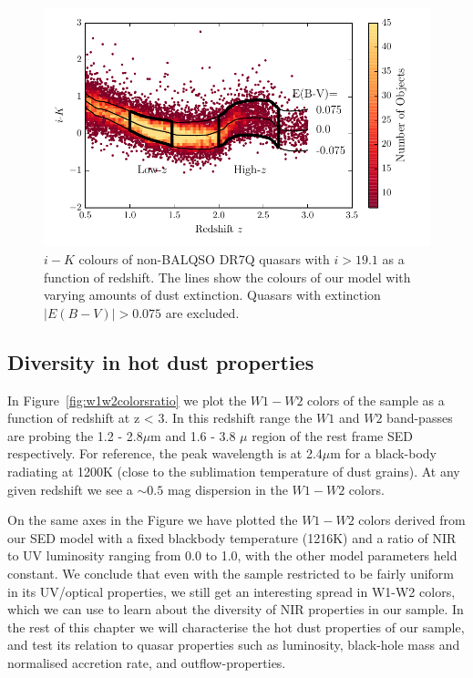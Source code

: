 \begin{figure}
  \centering
  \includegraphics[width=\columnwidth]{figures/chapter05/ik_versus_z_low_ext.pdf}
  \caption{$i-K$ colours of non-BALQSO DR7Q quasars with $i>19.1$ as a function of redshift. The lines show the colours of our model with varying amounts of dust extinction. Quasars with extinction $|E(B-V)|>0.075$ are excluded.}
  \label{fig:ikzplot}
\end{figure}

\subsection{Diversity in hot dust properties}

In Figure~\ref{fig:w1w2colorsratio} we plot the $W1 - W2$ colors of the sample as a function of redshift at z < 3. 
In this redshift range the $W1$ and $W2$ band-passes are probing the 1.2 - 2.8$\mu$m and 1.6 - 3.8 $\mu$ region of the rest frame SED respectively. 
For reference, the peak wavelength is at 2.4$\mu$m for a black-body radiating at 1200K (close to the sublimation temperature of dust grains). 
At any given redshift we see a $\sim 0.5$ mag dispersion in the $W1-W2$ colors. 

On the same axes in the Figure we have plotted the $W1 - W2$ colors derived from our SED model with a fixed blackbody temperature (1216K) and a ratio of NIR to UV luminosity ranging from 0.0 to 1.0, with the other model parameters held constant. 
We conclude that even with the sample restricted to be fairly uniform in its UV/optical properties, we still get an interesting spread in W1-W2 colors, which we can use to learn about the diversity of NIR properties in our sample. 
In the rest of this chapter we will characterise the hot dust properties of our sample, and test its relation to quasar properties such as luminosity, black-hole mass and normalised accretion rate, and outflow-properties. 

